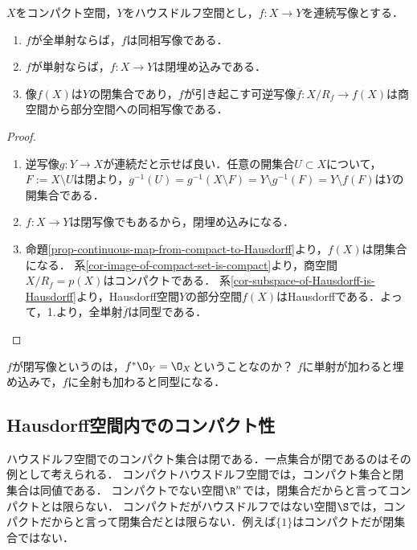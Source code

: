 \documentclass[uplatex,dvipdfmx]{jsreport}
\begin{document}
\begin{corollary}\label{cor-Compact-Hausdorff}
    $X$をコンパクト空間，$Y$をハウスドルフ空間とし，$f:X\to Y$を連続写像とする．
    \begin{enumerate}
        \item $f$が全単射ならば，$f$は同相写像である．
        \item $f$が単射ならば，$f:X\to Y$は閉埋め込みである．
        \item 像$f(X)$は$Y$の閉集合であり，$f$が引き起こす可逆写像$\overline{f}:X/R_f\to f(X)$は商空間から部分空間への同相写像である．
    \end{enumerate}
\end{corollary}
\begin{proof}\mbox{}
    \begin{enumerate}
        \item 逆写像$g:Y\to X$が連続だと示せば良い．任意の開集合$U\subset X$について，$F:=X\setminus U$は閉より，$g^{-1}(U)=g^{-1}(X\setminus F)=Y\setminus g^{-1}(F)=Y\setminus f(F)$は$Y$の開集合である．
        \item $f:X\to Y$は閉写像でもあるから，閉埋め込みになる．
        \item 命題\ref{prop-continuous-map-from-compact-to-Hausdorff}より，$f(X)$は閉集合になる．
        系\ref{cor-image-of-compact-set-is-compact}より，商空間$X/R_f=p(X)$はコンパクトである．
        系\ref{cor-subspace-of-Hausdorff-is-Hausdorff}より，Hausdorff空間$Y$の部分空間$f(X)$はHausdorffである．よって，1.より，全単射$\overline{f}$は同型である．
    \end{enumerate}
\end{proof}
\begin{remarks}
    $f$が閉写像というのは，$f^*\O_Y=\O_X$ということなのか？
    $f$に単射が加わると埋め込みで，$f$に全射も加わると同型になる．
\end{remarks}

\subsection{Hausdorff空間内でのコンパクト性}

\begin{tcolorbox}[colframe=ForestGreen, colback=ForestGreen!10!white, breakable ,colbacktitle=ForestGreen!40!white, coltitle=black,fonttitle=\bfseries\sffamily
    ,title=Hausdorff空間内でのコンパクト集合はもっと詳細に特徴付けることが出来る]
    ハウスドルフ空間でのコンパクト集合は閉である．一点集合が閉であるのはその例として考えられる．
    コンパクトハウスドルフ空間では，コンパクト集合と閉集合は同値である．
    コンパクトでない空間$\R^n$では，閉集合だからと言ってコンパクトとは限らない．
    コンパクトだがハウスドルフではない空間$\S$では，コンパクトだからと言って閉集合だとは限らない．例えば$\{1\}$はコンパクトだが閉集合ではない．
\end{tcolorbox}
\end{document}
